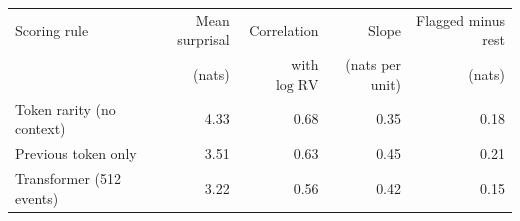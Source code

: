 \begin{tabular}{lrrrr}
\toprule
Scoring rule & Mean surprisal & Correlation & Slope & Flagged minus rest \\
 & (nats) & with $\log\mathrm{RV}$ & (nats per unit) & (nats) \\
\midrule
Token rarity (no context) & 4.33 & 0.68 & 0.35 & 0.18 \\
Previous token only & 3.51 & 0.63 & 0.45 & 0.21 \\
Transformer (512 events) & 3.22 & 0.56 & 0.42 & 0.15 \\
\bottomrule
\end{tabular}
